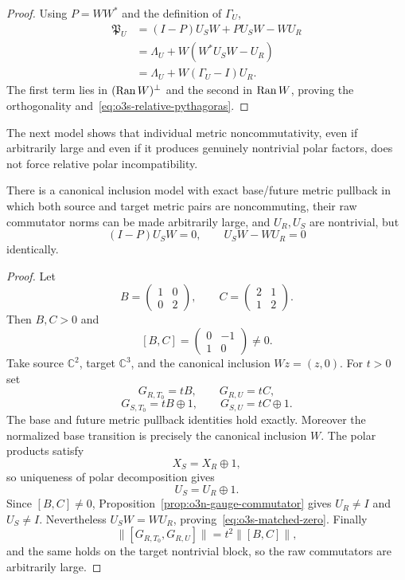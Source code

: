\begin{proof}
Using $P=WW^*$ and the definition of $\Gamma_U$,
\[
\begin{aligned}
 \mathfrak P_U
 &=(I-P)U_SW+PU_SW-WU_R\\
 &=\Lambda_U+W(W^*U_SW-U_R)\\
 &=\Lambda_U+W(\Gamma_U-I)U_R.
\end{aligned}
\]
The first term lies in $(\operatorname{Ran} W)^\perp$ and the second in $\operatorname{Ran} W$, proving the
orthogonality and~\eqref{eq:o3s-relative-pythagoras}.
\end{proof}

The next model shows that individual metric noncommutativity, even if arbitrarily large
and even if it produces genuinely nontrivial polar factors, does not force relative
polar incompatibility.

\begin{proposition}
\label{prop:o3s-matched-countermodel}
There is a canonical inclusion model with exact base/future metric pullback in which
both source and target metric pairs are noncommuting, their raw commutator norms can be
made arbitrarily large, and $U_R,U_S$ are nontrivial, but
\[
 \boxed{
 (I-P)U_SW=0,
 \qquad
 U_SW-WU_R=0
 }
\tag{O3S.6}\label{eq:o3s-matched-zero}
\]
identically.
\end{proposition}

\begin{proof}
Let
\[
 B=\begin{pmatrix}1&0\\0&2\end{pmatrix},
 \qquad
 C=\begin{pmatrix}2&1\\1&2\end{pmatrix}.
\]
Then $B,C>0$ and
\[
 [B,C]=\begin{pmatrix}0&-1\\1&0\end{pmatrix}\ne0.
\]
Take source $\mathbb C^2$, target $\mathbb C^3$, and the canonical inclusion
$Wz=(z,0)$.  For $t>0$ set
\[
 G_{R,T_0}=tB,
 \qquad G_{R,U}=tC,
\]
\[
 G_{S,T_0}=tB\oplus1,
 \qquad G_{S,U}=tC\oplus1.
\]
The base and future metric pullback identities hold exactly.  Moreover the normalized
base transition is precisely the canonical inclusion $W$.  The polar products satisfy
\[
 X_S=X_R\oplus1,
\]
so uniqueness of polar decomposition gives
\[
 U_S=U_R\oplus1.
\]
Since $[B,C]\ne0$, Proposition~\ref{prop:o3n-gauge-commutator} gives $U_R\ne I$ and
$U_S\ne I$.  Nevertheless $U_SW=WU_R$, proving~\eqref{eq:o3s-matched-zero}.  Finally
\[
 \|[G_{R,T_0},G_{R,U}]\|
 =t^2\|[B,C]\|,
\]
and the same holds on the target nontrivial block, so the raw commutators are
arbitrarily large.
\end{proof}

